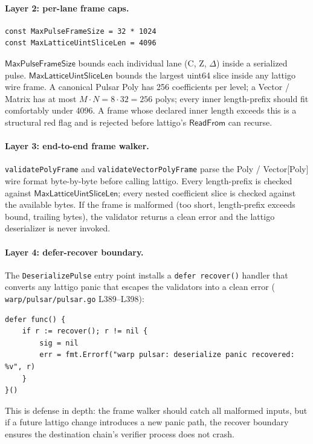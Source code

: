 \paragraph{Layer 2: per-lane frame caps.}
\begin{verbatim}
const MaxPulseFrameSize = 32 * 1024
const MaxLatticeUintSliceLen = 4096
\end{verbatim}
$\mathsf{MaxPulseFrameSize}$ bounds each individual lane (C, Z, $\Delta$) inside a serialized pulse. $\mathsf{MaxLatticeUintSliceLen}$ bounds the largest uint64 slice inside any lattigo wire frame. A canonical Pulsar Poly has 256 coefficients per level; a Vector / Matrix has at most $M \cdot N = 8 \cdot 32 = 256$ polys; every inner length-prefix should fit comfortably under 4096. A frame whose declared inner length exceeds this is a structural red flag and is rejected before lattigo's $\mathsf{ReadFrom}$ can recurse.

\paragraph{Layer 3: end-to-end frame walker.} \texttt{validatePolyFrame} and \texttt{validateVectorPolyFrame} parse the Poly / Vector[Poly] wire format byte-by-byte before calling lattigo. Every length-prefix is checked against $\mathsf{MaxLatticeUintSliceLen}$; every nested coefficient slice is checked against the available bytes. If the frame is malformed (too short, length-prefix exceeds bound, trailing bytes), the validator returns a clean error and the lattigo deserializer is never invoked.

\paragraph{Layer 4: defer-recover boundary.} The \texttt{DeserializePulse} entry point installs a \texttt{defer recover()} handler that converts any lattigo panic that escapes the validators into a clean error (\cite{warpgo} \texttt{warp/pulsar/pulsar.go} L389--L398):

\begin{verbatim}
defer func() {
    if r := recover(); r != nil {
        sig = nil
        err = fmt.Errorf("warp pulsar: deserialize panic recovered: %v", r)
    }
}()
\end{verbatim}

This is defense in depth: the frame walker should catch all malformed inputs, but if a future lattigo change introduces a new panic path, the recover boundary ensures the destination chain's verifier process does not crash.

